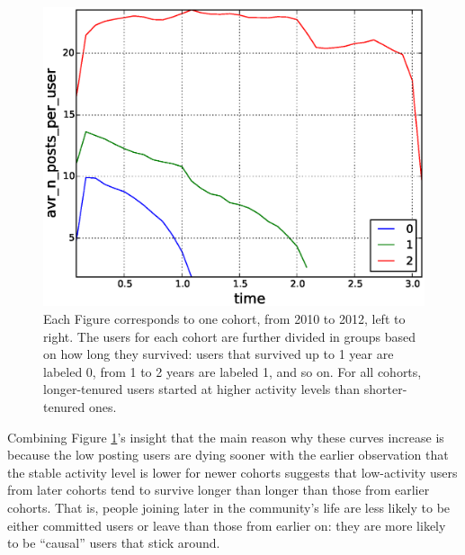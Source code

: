 \begin{figure}[!tb]
\includegraphics[scale=0.25]{./images/avr_posts_per_user_for_surviving_year_for_2012.eps}
\caption{Each Figure corresponds to one cohort, from 2010 to 2012, left to right. The users for each cohort are further divided in groups based on how long they survived: users that survived up to 1 year are labeled 0, from 1 to 2 years are labeled 1, and so on.  For all cohorts, longer-tenured users started at higher activity levels than shorter-tenured ones.}
\label{fig:avr_posts_per_user_for_surviving_year}
\end{figure}


Combining Figure \ref{fig:avr_posts_per_user_for_surviving_year}'s insight that the main reason why these curves increase is because the low posting users are dying sooner with the earlier observation that the stable activity level is lower for newer cohorts suggests that low-activity users from later cohorts tend to survive longer than longer than those from earlier cohorts.  That is, people joining later in the community's life are less likely to be either committed users or leave than those from earlier on: they are more likely to be ``causal'' users that stick around.

